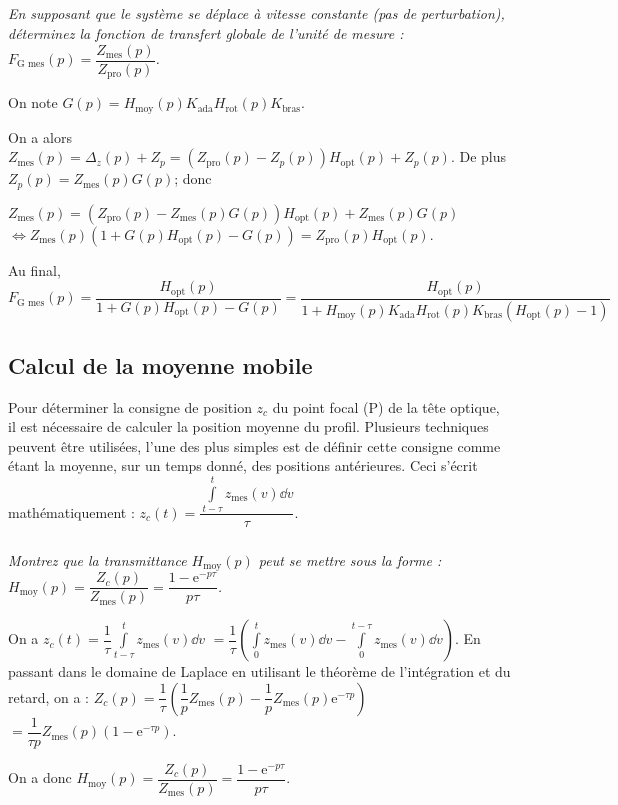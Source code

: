\subparagraph{\label{q_08}}\textit{ En supposant que le système se déplace à vitesse constante (pas de perturbation), déterminez la fonction de transfert globale de l’unité de mesure : $F_{\text{G mes}}(p)=\dfrac{Z_{\text{mes}}(p)}{Z_{\text{pro}}(p)}$.}
\ifprof
\begin{corrige}
On note $G(p)=H_{\text{moy}}(p) K_{\text{ada}} H_{\text{rot}}(p) K_{\text{bras}}$.

On a alors $Z_{\text{mes}}(p)=\Delta_z(p)+Z_p = \left( Z_{\text{pro}}(p) -Z_p(p)\right)  H_{\text{opt}}(p)+Z_p(p)$.
De plus $Z_p (p)= Z_{\text{mes}}(p) G(p)$; donc 

$Z_{\text{mes}}(p)=  \left( Z_{\text{pro}}(p) - Z_{\text{mes}}(p) G(p)\right)  H_{\text{opt}}(p)+ Z_{\text{mes}}(p) G(p)$ 
$\Leftrightarrow Z_{\text{mes}}(p) \left(1+G(p) H_{\text{opt}}(p) - G(p) \right)=   Z_{\text{pro}}(p)  H_{\text{opt}}(p)$. 

Au final,  $F_{\text{G mes}}(p)=\dfrac{H_{\text{opt}}(p)}{1+G(p) H_{\text{opt}}(p) - G(p)} = 
\dfrac{H_{\text{opt}}(p)}{1+H_{\text{moy}}(p) K_{\text{ada}} H_{\text{rot}}(p) K_{\text{bras}}\left( H_{\text{opt}}(p) - 1\right)}$

\end{corrige}
\else
\fi

\subsection{Calcul de la moyenne mobile}
\ifprof
\else
Pour déterminer la consigne de position $z_c$ du point focal (P) de la tête optique, il est nécessaire de
calculer la position moyenne du profil. Plusieurs techniques peuvent être utilisées, l’une des plus simples
est de définir cette consigne comme étant la moyenne, sur un temps donné, des positions antérieures. Ceci
s’écrit mathématiquement : $z_c(t)=\dfrac{\int\limits_{t-\tau}^{t}z_{\text{mes}}(v)\dd v}{\tau}$.
\fi




\subparagraph{\label{q_}}\textit{Montrez que la transmittance $H_{\text{moy}}(p)$ peut se mettre sous la forme :
$H_{\text{moy}}(p) = \dfrac{Z_c(p)}{Z_{\text{mes}}(p)}=\dfrac{1-\text{e}^{-p\tau}}{p \tau}$.}
\ifprof
\begin{corrige}
On a $z_c(t)=\dfrac{1}{\tau} \int\limits_{t-\tau}^{t}z_{\text{mes}}(v)\dd v$ 
$=\dfrac{1}{\tau} \left( \int\limits_{0}^{t}z_{\text{mes}}(v)\dd v - \int\limits_{0}^{t-\tau}z_{\text{mes}}(v)\dd v \right)$. En passant dans le domaine de Laplace en utilisant le théorème de l'intégration et du retard, on a : 
$Z_c(p)=\dfrac{1}{\tau} \left( \dfrac{1}{p}Z_{\text{mes}}(p)- \dfrac{1}{p}Z_{\text{mes}}(p)\text{e}^{-\tau p}  \right)$$=\dfrac{1}{\tau p} Z_{\text{mes}}(p)\left( 1- \text{e}^{-\tau p}  \right)$.

On a donc $H_{\text{moy}}(p) = \dfrac{Z_c(p)}{Z_{\text{mes}}(p)}=\dfrac{1-\text{e}^{-p\tau}}{p \tau}$.

\end{corrige}
\else
\fi

